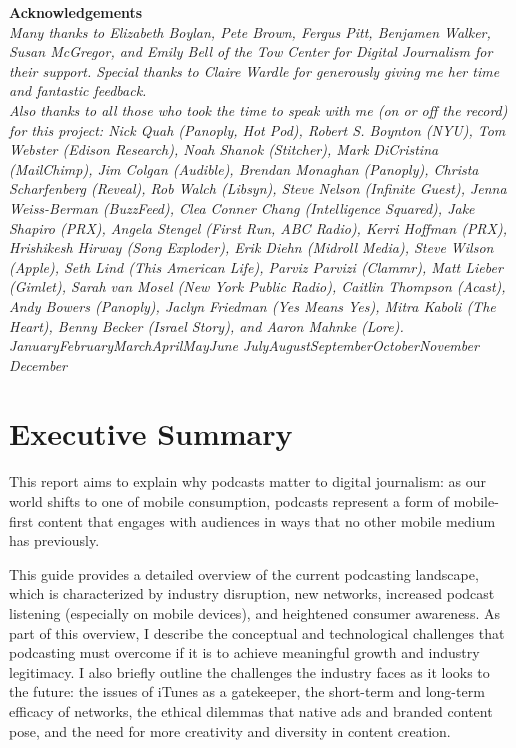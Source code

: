 \documentclass[notoc, symmetric, nobib, nols]{towcenter-guideto-book}
\newcommand{\monthyear}{%
  \ifcase\month\or January\or February\or March\or April\or May\or June\or
  July\or August\or September\or October\or November\or
  December\fi\space\number\year
}
\newcommand{\blankpage}{\newpage\hbox{}\thispagestyle{empty}\newpage}
\begin{document}
\blankpage
\blankpage


\null
\begin{fullwidth}
\noindent\textsf{\textbf{Acknowledgements}} \\[0.3cm]
\noindent\textit{Many thanks to Elizabeth Boylan, Pete Brown, Fergus Pitt, Benjamen Walker, Susan McGregor, and Emily Bell of the Tow Center for Digital Journalism for their support. Special thanks to Claire Wardle for generously giving me her time and fantastic feedback.
}\\[0.1cm]\noindent\textit{
Also thanks to all those who took the time to speak with me (on or off the record) for this project: Nick Quah (Panoply, Hot Pod), Robert S. Boynton (NYU), Tom Webster (Edison Research), Noah Shanok (Stitcher), Mark DiCristina (MailChimp), Jim Colgan (Audible), Brendan Monaghan (Panoply), Christa Scharfenberg (\textit{Reveal}), Rob Walch (Libsyn), Steve Nelson (Infinite Guest), Jenna Weiss-Berman (BuzzFeed), Clea Conner Chang (\textit{Intelligence Squared}), Jake Shapiro (PRX), Angela Stengel (First Run, ABC Radio), Kerri Hoffman (PRX), Hrishikesh Hirway (\textit{Song Exploder}), Erik Diehn (Midroll Media), Steve Wilson (Apple), Seth Lind (\textit{This American Life}), Parviz Parvizi (Clammr), Matt Lieber (Gimlet), Sarah van Mosel (New York Public Radio), Caitlin Thompson (Acast), Andy Bowers (Panoply), Jaclyn Friedman (Yes Means Yes), Mitra Kaboli (The Heart), Benny Becker (Israel Story), and Aaron Mahnke (\textit{Lore}).  
}\\[0.1cm]
\noindent\textit{\monthyear}
\end{fullwidth}
\tableofcontents


\cleardoublepage


\mainmatter


\chapter{Executive Summary}

This report aims to explain why podcasts matter to digital journalism: as our world shifts to one of mobile consumption, podcasts represent a form of mobile-first content that engages with audiences in ways that no other mobile medium has previously.

This guide provides a detailed overview of the current podcasting landscape, which is characterized by industry disruption, new networks, increased podcast listening (especially on mobile devices), and heightened consumer awareness. As part of this overview, I describe the conceptual and technological challenges that podcasting must overcome if it is to achieve meaningful growth and industry legitimacy. I also briefly outline the challenges the industry faces as it looks to the future: the issues of iTunes as a gatekeeper, the short-term and long-term efficacy of networks, the ethical dilemmas that native ads and branded content pose, and the need for more creativity and diversity in content creation.
\end{document}
